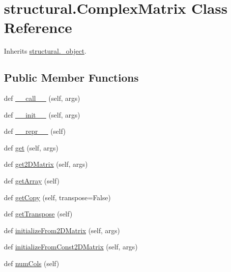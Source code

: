 \hypertarget{classstructural_1_1_complex_matrix}{}\section{structural.\+Complex\+Matrix Class Reference}
\label{classstructural_1_1_complex_matrix}


Inherits \hyperlink{classstructural_1_1__object}{structural.\+\_\+object}.

\subsection*{Public Member Functions}
\begin{DoxyCompactItemize}
\item 
def \hyperlink{classstructural_1_1_complex_matrix_a19bdf9ca0693218f162750457bda4e47}{\+\_\+\+\_\+call\+\_\+\+\_\+} (self, args)
\item 
def \hyperlink{classstructural_1_1_complex_matrix_ad1dd6cdcf8186a8cec63cd60c8272323}{\+\_\+\+\_\+init\+\_\+\+\_\+} (self, args)
\item 
def \hyperlink{classstructural_1_1_complex_matrix_a73ce0f6bf58d1fd8c7ab2349bc9a5941}{\+\_\+\+\_\+repr\+\_\+\+\_\+} (self)
\item 
def \hyperlink{classstructural_1_1_complex_matrix_ae006422870fd2789f65c6dac8c4a6633}{get} (self, args)
\item 
def \hyperlink{classstructural_1_1_complex_matrix_a0ef928c4eee117d45fcde4dcfecbda73}{get2\+D\+Matrix} (self, args)
\item 
def \hyperlink{classstructural_1_1_complex_matrix_aaaf90b4cf0ead3b6891b6fe8fca4bf67}{get\+Array} (self)
\item 
def \hyperlink{classstructural_1_1_complex_matrix_a13c726244e4c458529d6867d188543a9}{get\+Copy} (self, transpose=False)
\item 
def \hyperlink{classstructural_1_1_complex_matrix_aa135851d4314a2a6246cde0e6aceac2e}{get\+Transpose} (self)
\item 
def \hyperlink{classstructural_1_1_complex_matrix_acb7b64d725cab166fe9a3f11a4a890b8}{initialize\+From2\+D\+Matrix} (self, args)
\item 
def \hyperlink{classstructural_1_1_complex_matrix_ae9ae7e1c5307ec81f2bcb3a219d059f3}{initialize\+From\+Const2\+D\+Matrix} (self, args)
\item 
def \hyperlink{classstructural_1_1_complex_matrix_a9f34e0f4b33604cad6983f52508c2f62}{num\+Cols} (self)

\end{DoxyCompactItemize}
